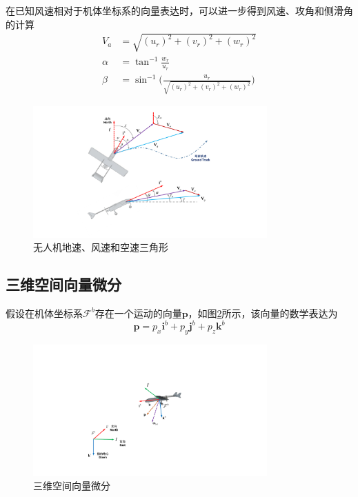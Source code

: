 在已知风速相对于机体坐标系的向量表达时，可以进一步得到风速、攻角和侧滑角的计算
\begin{align}
	V_a &= \sqrt{(u_r)^2+(v_r)^2+(w_r)^2} \\
	\alpha &=  \tan^{-1}\frac{w_r}{u_r}  \\
	\beta  &=  \sin^{-1} \big( \frac{u_r}{\sqrt{(u_r)^2+(v_r)^2+(w_r)^2}} \big)
\end{align}

\begin{figure}[htb]   
	\centering
	\includegraphics[width=0.8\textwidth]{figs/chp02/chp02_04_uav_wind_frame.pdf}
	\caption{无人机地速、风速和空速三角形}
	\label{fig:chp02_04_uav_wind_frame}
\end{figure}






\subsection{三维空间向量微分}
假设在机体坐标系$\mathcal{F}^b$存在一个运动的向量$\mathbf{p}$，如图\ref{fig:chp02_06_vector_rotation}所示，该向量的数学表达为 
\begin{equation}
	\mathbf{p }= p_x \mathbf{i}^b +  p_y \mathbf{j}^b +  p_z \mathbf{k}^b
\end{equation}
\begin{figure}[htb]   
	\centering
	\includegraphics[width=0.8\textwidth]{figs/chp02/chp02_06_vector_rotation.pdf}
	\caption{三维空间向量微分}
	\label{fig:chp02_06_vector_rotation}
\end{figure}

